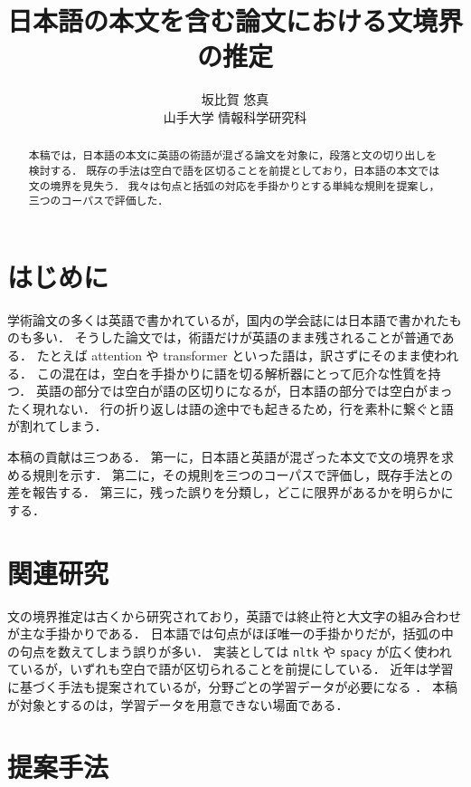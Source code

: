 \documentclass[11pt,a4paper]{article}
\title{日本語の本文を含む論文における文境界の推定}
\author{坂比賀 悠真\\ 山手大学 情報科学研究科}
\date{}
\newcommand{\s}[1]{#1}
\begin{document}
\maketitle

\begin{abstract}
\s{本稿では，日本語の本文に英語の術語が混ざる論文を対象に，段落と文の切り出しを検討する．}%
\s{既存の手法は空白で語を区切ることを前提としており，日本語の本文では文の境界を見失う．}%
\s{我々は句点と括弧の対応を手掛かりとする単純な規則を提案し，三つのコーパスで評価した．}%
\end{abstract}

\section{はじめに}

\s{学術論文の多くは英語で書かれているが，国内の学会誌には日本語で書かれたものも多い．}%
\s{そうした論文では，術語だけが英語のまま残されることが普通である．}%
\s{たとえば attention や transformer といった語は，訳さずにそのまま使われる．}%
\s{この混在は，空白を手掛かりに語を切る解析器にとって厄介な性質を持つ．}%
\s{英語の部分では空白が語の区切りになるが，日本語の部分では空白がまったく現れない．}%
\s{行の折り返しは語の途中でも起きるため，行を素朴に繋ぐと語が割れてしまう．}%

\s{本稿の貢献は三つある．}%
\s{第一に，日本語と英語が混ざった本文で文の境界を求める規則を示す．}%
\s{第二に，その規則を三つのコーパスで評価し，既存手法との差を報告する．}%
\s{第三に，残った誤りを分類し，どこに限界があるかを明らかにする．}%

\section{関連研究}

\s{文の境界推定は古くから研究されており，英語では終止符と大文字の組み合わせが主な手掛かりである．}%
\s{日本語では句点がほぼ唯一の手掛かりだが，括弧の中の句点を数えてしまう誤りが多い．}%
\s{実装としては \texttt{nltk} や \texttt{spacy} が広く使われているが，いずれも空白で語が区切られることを前提にしている．}%
\s{近年は学習に基づく手法も提案されているが，分野ごとの学習データが必要になる \cite{sato2021}．}%
\s{本稿が対象とするのは，学習データを用意できない場面である．}%

\section{提案手法}
\end{document}
